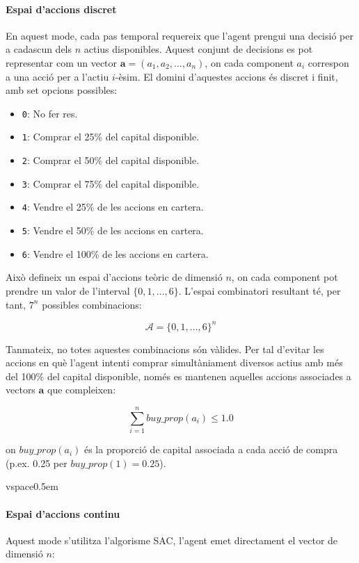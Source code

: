 \documentclass[12pt,a4paper,twoside]{book}
\begin{document}
\paragraph{Espai d'accions discret}
En aquest mode, cada pas temporal requereix que l'agent prengui una decisió per a cadascun dels $n$ actius disponibles. Aquest conjunt de decisions es pot representar com un vector $\mathbf{a} = (a_1, a_2, \ldots, a_n)$, on cada component $a_i$ correspon a una acció per a l'actiu $i$-èsim. El domini d'aquestes accions és discret i finit, amb set opcions possibles:

\begin{itemize}
    \item \texttt{0}: No fer res.
    \item \texttt{1}: Comprar el 25\% del capital disponible.
    \item \texttt{2}: Comprar el 50\% del capital disponible.
    \item \texttt{3}: Comprar el 75\% del capital disponible.
    \item \texttt{4}: Vendre el 25\% de les accions en cartera.
    \item \texttt{5}: Vendre el 50\% de les accions en cartera.
    \item \texttt{6}: Vendre el 100\% de les accions en cartera.
\end{itemize}

Això defineix un espai d'accions teòric de dimensió $n$, on cada component pot prendre un valor de l'interval $\{0, 1, \dots, 6\}$. L'espai combinatori resultant té, per tant, $7^n$ possibles combinacions:

\[
\mathcal{A} = \{0,1,\ldots,6\}^n
\]

Tanmateix, no totes aquestes combinacions són vàlides. Per tal d'evitar les accions en què l'agent intenti comprar simultàniament diversos actius amb més del 100\% del capital disponible, només es mantenen aquelles accions associades a vectors $\mathbf{a}$ que compleixen:

\[
\sum_{i=1}^{n} buy\_prop(a_i) \leq 1.0
\]

on $buy\_prop(a_i)$ és la proporció de capital associada a cada acció de compra (p.ex. 0.25 per $buy\_prop(1)=0.25$).

vspace{0.5em}
\paragraph{Espai d'accions continu}

Aquest mode s'utilitza l'algorisme SAC, l'agent emet directament el vector de dimensió $n$:
\end{document}
